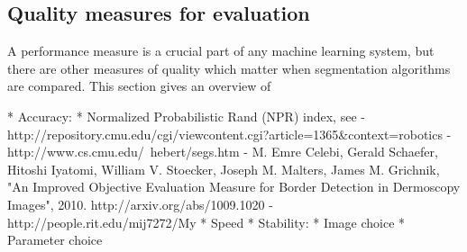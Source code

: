 \subsection{Quality measures for evaluation}\label{sec:q}

A performance measure is a crucial part of any machine learning system, but
there are other measures of quality which matter when segmentation algorithms
are compared. This section gives an overview of 

* Accuracy:
    * Normalized Probabilistic Rand (NPR) index, see
        - http://repository.cmu.edu/cgi/viewcontent.cgi?article=1365&context=robotics
        - http://www.cs.cmu.edu/~hebert/segs.htm
        - M. Emre Celebi, Gerald Schaefer, Hitoshi Iyatomi, William V.
          Stoecker, Joseph M. Malters, James M. Grichnik, "An Improved
          Objective Evaluation Measure for Border Detection in
          Dermoscopy Images", 2010. http://arxiv.org/abs/1009.1020
        - http://people.rit.edu/mij7272/My%
* Speed
* Stability:
    * Image choice
    * Parameter choice
